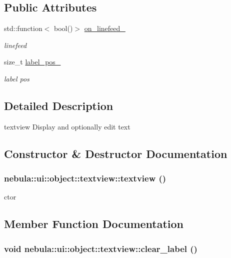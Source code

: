 \subsection*{Public Attributes}
\begin{DoxyCompactItemize}
\item 
std::function$<$ bool()$>$ \hyperlink{classnebula_1_1ui_1_1object_1_1textview_ae6966d898780eddaba77197d6efab38a}{on\_\-linefeed\_\-}
\begin{DoxyCompactList}\small\item\em linefeed \item\end{DoxyCompactList}\item 
size\_\-t \hyperlink{classnebula_1_1ui_1_1object_1_1textview_ad8c71f9fc11c3d4787bbc88701d55b82}{label\_\-pos\_\-}
\begin{DoxyCompactList}\small\item\em label pos \item\end{DoxyCompactList}\end{DoxyCompactItemize}


\subsection{Detailed Description}
textview Display and optionally edit text 

\subsection{Constructor \& Destructor Documentation}
\hypertarget{classnebula_1_1ui_1_1object_1_1textview_a1b6feaaf165e27e9c56ef62ccdc7e0ee}{
\subsubsection[{textview}]{\setlength{\rightskip}{0pt plus 5cm}nebula::ui::object::textview::textview ()}}
\label{classnebula_1_1ui_1_1object_1_1textview_a1b6feaaf165e27e9c56ef62ccdc7e0ee}


ctor 

\subsection{Member Function Documentation}
\hypertarget{classnebula_1_1ui_1_1object_1_1textview_af3d558c828f633eaecc15e5c933cf9c3}{
\subsubsection[{clear\_\-label}]{\setlength{\rightskip}{0pt plus 5cm}void nebula::ui::object::textview::clear\_\-label ()}}
\label{classnebula_1_1ui_1_1object_1_1textview_af3d558c828f633eaecc15e5c933cf9c3}


